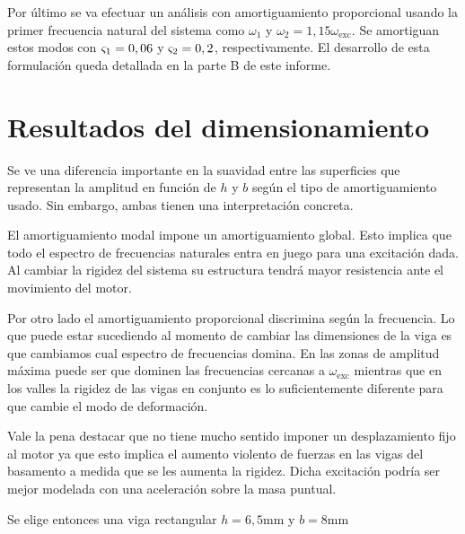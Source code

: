 \documentclass[onecolumn,10pt,titlepage,a4paper]{article}
\begin{document}
Por último se va efectuar un análisis con amortiguamiento proporcional usando la primer frecuencia natural del sistema como $\omega_1$ y $\omega_2 = 1,15 \omega_{\mathrm{exc}}$. Se amortiguan estos modos con $\varsigma_{1}=0,06$ y $\varsigma_2=0,2$, respectivamente. El desarrollo de esta formulación queda detallada en la parte B de este informe. 

\section{Resultados del dimensionamiento}
Se ve una diferencia importante en la suavidad entre las superficies que representan la amplitud en función de $h$ y $b$ según el tipo de amortiguamiento usado. Sin embargo, ambas tienen una interpretación concreta.

El amortiguamiento modal impone un amortiguamiento global. Esto implica que todo el espectro de frecuencias naturales entra en juego para una excitación dada. Al cambiar la rigidez del sistema su estructura tendrá mayor resistencia ante el movimiento del motor.

Por otro lado el amortiguamiento proporcional discrimina según la frecuencia. Lo que puede estar sucediendo al momento de cambiar las dimensiones de la viga es que cambiamos cual espectro de frecuencias domina. En las zonas de amplitud máxima puede ser que dominen las frecuencias cercanas a $\omega_{\mathrm{exc}}$ mientras que en los valles la rigidez de las vigas en conjunto es lo suficientemente diferente para que cambie el modo de deformación.

Vale la pena destacar que no tiene mucho sentido imponer un desplazamiento fijo al motor ya que esto implica el aumento violento de fuerzas en las vigas del basamento a medida que se les aumenta la rigidez. Dicha excitación podría ser mejor modelada con una aceleración sobre la masa puntual.

Se elige entonces una viga rectangular $h=6,5\si{\milli \meter}$ y $b=8\si{\milli \meter}$
\end{document}
